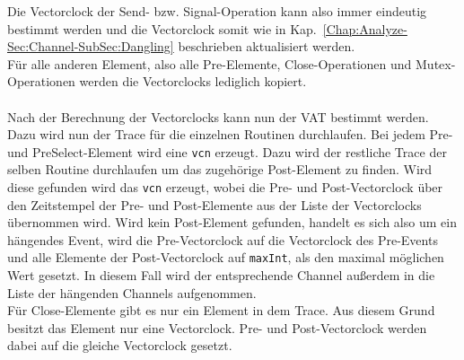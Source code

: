 Die Vectorclock der Send- bzw. Signal-Operation kann also immer eindeutig bestimmt 
werden und die Vectorclock somit wie in Kap.~\ref{Chap:Analyze-Sec:Channel-SubSec:Dangling}
beschrieben aktualisiert werden.\\
Für alle anderen Element, also alle Pre-Elemente, Close-Operationen und Mutex-Operationen 
werden die Vectorclocks lediglich kopiert.\\\\
Nach der Berechnung der Vectorclocks kann nun der VAT bestimmt werden. 
Dazu wird nun der Trace für die einzelnen Routinen durchlaufen. Bei jedem 
Pre- und PreSelect-Element wird eine \texttt{vcn} erzeugt. Dazu wird der restliche Trace 
der selben Routine durchlaufen um das zugehörige Post-Element zu finden. 
Wird diese gefunden wird 
das \texttt{vcn} erzeugt, wobei die Pre- und Post-Vectorclock über den 
Zeitstempel der Pre- und Post-Elemente aus der Liste der Vectorclocks 
übernommen wird.
Wird kein Post-Element gefunden, handelt es sich also um ein hängendes Event, 
wird die Pre-Vectorclock auf die Vectorclock des Pre-Events und alle Elemente 
der Post-Vectorclock auf \texttt{maxInt}, als den maximal möglichen Wert 
gesetzt. In diesem Fall wird der entsprechende Channel außerdem in die Liste der
hängenden Channels aufgenommen. 
\\
Für Close-Elemente gibt es nur ein Element in dem Trace. Aus diesem Grund 
besitzt das Element nur eine Vectorclock. Pre- und Post-Vectorclock werden 
dabei auf die gleiche Vectorclock gesetzt.

